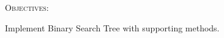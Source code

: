 
\textsc{Objectives:}
\begin{myenum}
\item Implement Binary Search Tree with supporting methods.
\end{myenum}

